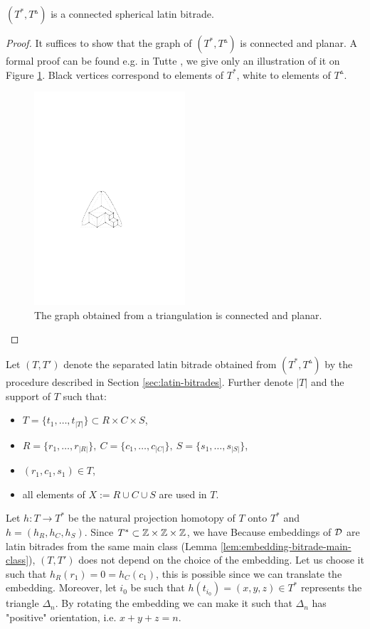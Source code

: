 \begin{lem}
$(T^*, T^\vartriangle)$ is a connected spherical latin bitrade.
\end{lem}
\begin{proof}
It suffices to show that the graph of $(T^*, T^\vartriangle)$ is connected and planar. A formal proof can be found e.g. in Tutte \cite{Tutte48}, we give only an illustration of it on Figure \ref{fig:triangulation-graph}. Black vertices correspond to elements of $T^*$, white to elements of $T^\vartriangle$.

\begin{figure}[htb]
\centering
\includegraphics[width=0.5\textwidth]{img/triangulation_graph.pdf}
\caption{The graph obtained from a triangulation is connected and planar.}
\label{fig:triangulation-graph}
\end{figure}
\end{proof}

Let $(T,T')$ denote the separated latin bitrade obtained from $(T^*, T^\vartriangle)$ by the procedure described in Section \ref{sec:latin-bitrades}. Further denote $|T|$ and the support of $T$ such that:
\begin{itemize}
	\item $T = \{t_1, \dots, t_{|T|}\} \subset R \times C \times S$,
	\item $R = \{r_1,\dots,r_{|R|}\},\ 
		C = \{c_1,\dots,c_{|C|}\},\ 
		S = \{s_1,\dots,s_{|S|}\}$,
	\item $(r_1,c_1,s_1) \in T$,
	\item all elements of $X := R \cup C \cup S$ are used in $T$.
\end{itemize}%
Let $h:T \rightarrow T^*$ be the natural projection homotopy of $T$ onto $T^*$ and $h = (h_R, h_C, h_S)$. Since $T^* \subset \mathbb Z \times \mathbb Z \times \mathbb Z$, we have
\cosyalign{
	h_R: R \rightarrow \Z,\ h_C: C \rightarrow \Z,\ h_S: S \rightarrow \Z.
}%
Because embeddings of $\mathcal D$ are latin bitrades from the same main class (Lemma \ref{lem:embedding-bitrade-main-class}), $(T,T')$ does not depend on the choice of the embedding. Let us choose it such that $h_R(r_1) = 0 = h_C(c_1)$, this is possible since we can translate the embedding. Moreover, let $i_0$ be such that $h(t_{i_0}) = (x,y,z) \in T^*$ represents the triangle $\Delta_n$. By rotating the embedding we can make it such that $\Delta_n$ has "positive" orientation, i.e. $x+y+z = n$.


